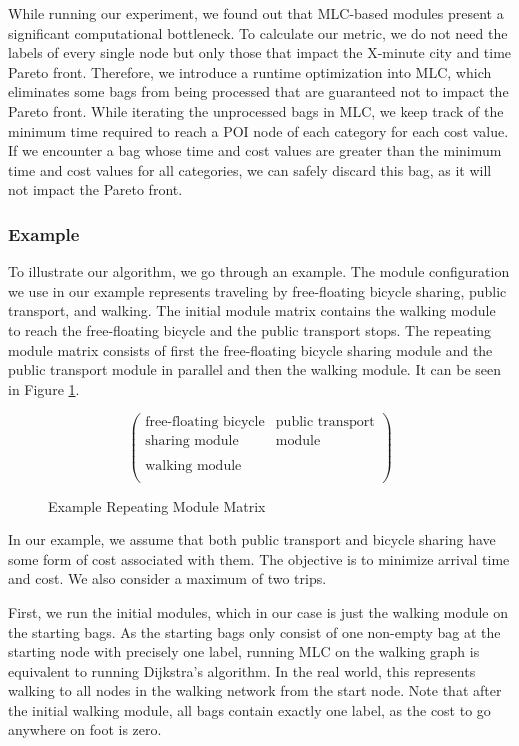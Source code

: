 While running our experiment, we found out that MLC-based modules present a significant computational bottleneck.
To calculate our metric, we do not need the labels of every single node but only those that impact the X-minute city and time Pareto front.
Therefore, we introduce a runtime optimization into MLC, which eliminates some bags from being processed that are guaranteed not to impact the Pareto front.
While iterating the unprocessed bags in MLC, we keep track of the minimum time required to reach a POI node of each category for each cost value.
If we encounter a bag whose time and cost values are greater than the minimum time and cost values for all categories, we can safely discard this bag, as it will not impact the Pareto front.


\subsubsection{Example}
\label{subsubsec:example}

To illustrate our algorithm, we go through an example.
The module configuration we use in our example represents traveling by free-floating bicycle sharing, public transport, and walking.
The initial module matrix contains the walking module to reach the free-floating bicycle and the public transport stops.
The repeating module matrix consists of first the free-floating bicycle sharing module and the public transport module in parallel and then the walking module.
It can be seen in Figure \ref{fig:example_module_matrix}.


\begin{figure}[ht]
\centering
\[
\begin{pmatrix}
\text{free-floating bicycle} & \text{public transport} \\
\text{sharing module} & \text{module} \\
\\
\text{walking module} & \\
\end{pmatrix}
\]
\caption{Example Repeating Module Matrix}
\label{fig:example_module_matrix}
\end{figure}

In our example, we assume that both public transport and bicycle sharing have some form of cost associated with them.
The objective is to minimize arrival time and cost.
We also consider a maximum of two trips.

First, we run the initial modules, which in our case is just the walking module on the starting bags.
As the starting bags only consist of one non-empty bag at the starting node with precisely one label, running MLC on the walking graph is equivalent to running Dijkstra's algorithm.
In the real world, this represents walking to all nodes in the walking network from the start node.
Note that after the initial walking module, all bags contain exactly one label, as the cost to go anywhere on foot is zero.

